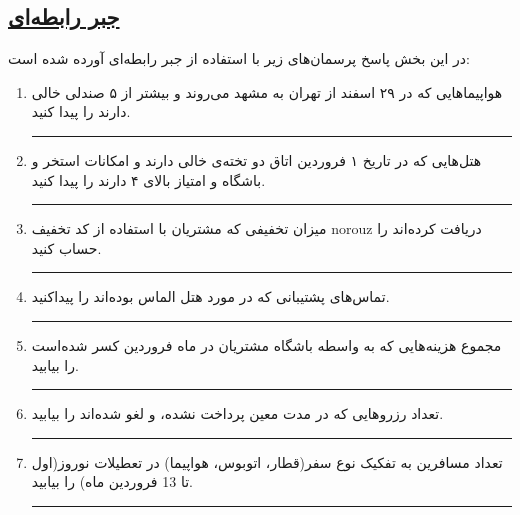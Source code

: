 \subsection*{\underline{جبر رابطه‌ای}}

در این بخش پاسخ پرسمان‌های زیر با استفاده از جبر رابطه‌ای آورده شده است:

\begin{enumerate}
	\item
	‌هواپیماهایی که در ۲۹ اسفند از تهران به مشهد می‌روند و بیشتر از ۵ صندلی خالی دارند را پیدا کنید.
	
	
	
	
	\rule{\linewidth}{0.05mm}
	
	\item
	هتل‌هایی که در تاریخ ۱ فروردین اتاق دو تخته‌ی خالی دارند و امکانات استخر و باشگاه و \linebreak امتیاز بالای ۴ دارند را پیدا کنید.
	
	
	
	\rule{\linewidth}{0.05mm}
	
	
	\item
	میزان تخفیفی که مشتریان با استفاده از کد تخفیف  norouz  دریافت کرده‌اند را حساب کنید.
	
	
	\rule{\linewidth}{0.05mm}
	
	
	\item
	تماس‌های پشتیبانی که در مورد هتل الماس بوده‌اند را پیداکنید.
	
	
	\rule{\linewidth}{0.05mm}	 
	
	
	
	
	\item
	مجموع هزینه‌هایی که‌ به واسطه باشگاه مشتریان در ماه فروردین کسر شده‌است را بیابید.
	
	
	\rule{\linewidth}{0.05mm}
	
	
	\item
	تعداد رزروهایی که در مدت معین پرداخت نشده، و لغو شده‌اند را بیابید.
	
	
	\rule{\linewidth}{0.05mm}
	
	
	
	
	\item
	تعداد مسافرین به تفکیک نوع سفر(قطار، اتوبوس، هواپیما) در تعطیلات نوروز(اول تا 13 فروردین ماه) را بیابید.
	
	
	\rule{\linewidth}{0.05mm}
	

\end{enumerate}
